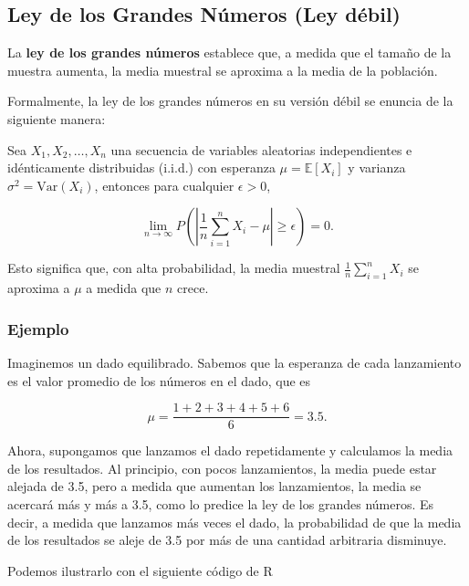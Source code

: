 \documentclass[
]{article}
\begin{document}
\subsection{Ley de los Grandes Números (Ley débil)}\label{ley-de-los-grandes-nuxfameros-ley-duxe9bil}

La \textbf{ley de los grandes números} establece que, a medida que el tamaño de la muestra aumenta, la media muestral se aproxima a la media de la población.

Formalmente, la ley de los grandes números en su versión débil se enuncia de la siguiente manera:

Sea \(X_1, X_2, \dots, X_n\) una secuencia de variables aleatorias independientes e idénticamente distribuidas (i.i.d.) con esperanza \(\mu = \mathbb{E}[X_i]\) y varianza \(\sigma^2 = \text{Var}(X_i)\), entonces para cualquier \(\epsilon > 0\),

\[
\lim_{n \to \infty} P \left( \left| \frac{1}{n} \sum_{i=1}^n X_i - \mu \right| \geq \epsilon \right) = 0.
\]

Esto significa que, con alta probabilidad, la media muestral \(\frac{1}{n} \sum_{i=1}^n X_i\) se aproxima a \(\mu\) a medida que \(n\) crece.

\subsubsection{Ejemplo}\label{ejemplo-3}

Imaginemos un dado equilibrado. Sabemos que la esperanza de cada lanzamiento es el valor promedio de los números en el dado, que es

\[
\mu = \frac{1+2+3+4+5+6}{6} = 3.5.
\]

Ahora, supongamos que lanzamos el dado repetidamente y calculamos la media de los resultados. Al principio, con pocos lanzamientos, la media puede estar alejada de 3.5, pero a medida que aumentan los lanzamientos, la media se acercará más y más a 3.5, como lo predice la ley de los grandes números. Es decir, a medida que lanzamos más veces el dado, la probabilidad de que la media de los resultados se aleje de 3.5 por más de una cantidad arbitraria disminuye.

Podemos ilustrarlo con el siguiente código de R
\end{document}
